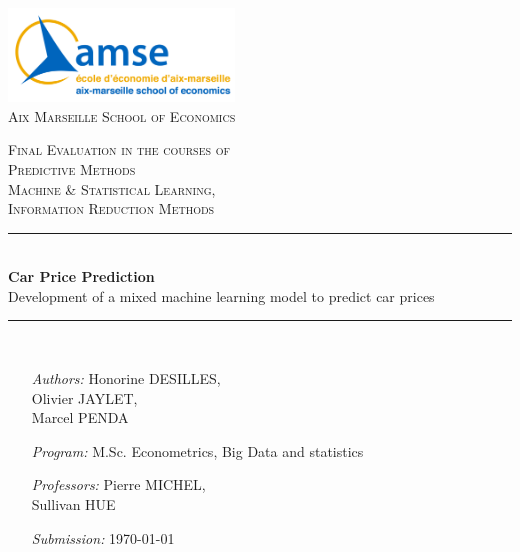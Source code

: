 \documentclass[12pt]{article}
\begin{document}
\newcommand{\HRule}{\rule{\linewidth}{0.5mm}} 

\thispagestyle{empty}

\begin{center}

\includegraphics[width=0.45\textwidth]{amse_logo.png}\\
\vspace{0.5cm}
\textsc{\huge Aix Marseille School of Economics} \\[0.3cm]

\vspace{2cm}


\textsc{\LARGE Final Evaluation in the courses of}\\[0.4cm]
\textsc{\large Predictive Methods}\\[0.1cm]
\textsc{\large Machine \& Statistical Learning,} \\[0.1cm]
\textsc{\large Information Reduction Methods}


\vspace{1cm}


\HRule \\[0.4cm]
{ \huge \textbf{Car Price Prediction} \\[0.5cm] 
Development of a mixed machine learning model to predict car prices
}\\[0.4cm]
\HRule \\[3cm]


\begin{minipage}[t]{0.8\textwidth}
	\begin{itemize}
    \item[\emph{Authors:}] Honorine DESILLES, \\
    Olivier JAYLET, \\
    Marcel PENDA 
    \item[\emph{Program:}] M.Sc. Econometrics, Big Data and statistics
	\item[\emph{Professors:}] Pierre MICHEL, \\ Sullivan HUE
	\item[\emph{Submission:}] \today
	\end{itemize}
\end{minipage}




\end{center}
\newpage
\end{document}
